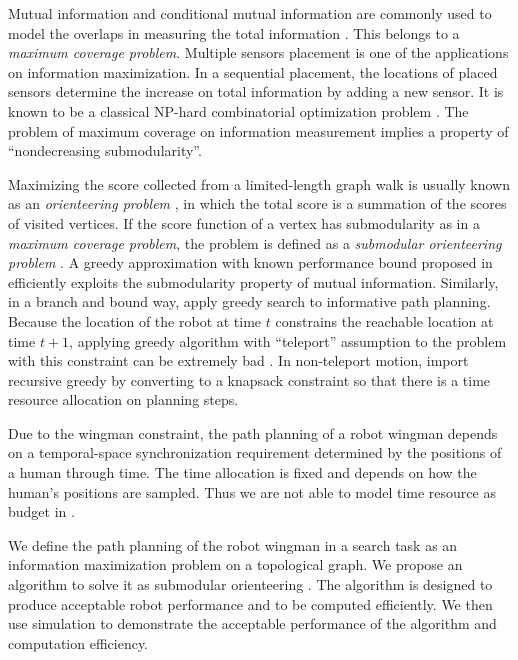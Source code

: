 Mutual information and conditional mutual information are commonly used to model the overlaps in measuring the total information \cite{singh2009efficient}.
This belongs to a \emph{maximum coverage problem}. 
Multiple sensors placement is one of the applications on information maximization.
In a sequential placement, the locations of placed sensors determine the increase on total information by adding a new sensor.
It is known to be a classical NP-hard combinatorial optimization problem \cite{megiddo1983maximum}.
The problem of maximum coverage on information measurement implies a property of ``nondecreasing submodularity''. 

Maximizing the score collected from a limited-length graph walk is usually known as an \emph{orienteering problem} \cite{Vansteenwegen20111}, in which the total score is a summation of the scores of visited vertices.
If the score function of a vertex has submodularity as in a \emph{maximum coverage problem}, the problem is defined as a \emph{submodular orienteering problem} \cite{chekuri2005recursive}.
A greedy approximation with known performance bound proposed in \cite{singh2009efficient} efficiently exploits the submodularity property of mutual information.
Similarly, in a branch and bound way, \cite{binney2012branch} apply greedy search to informative path planning.
Because the location of the robot at time $ t $ constrains the reachable location at time $ t+1 $, applying greedy algorithm with ``teleport'' assumption to the problem with this constraint can be extremely bad \cite{krause2012submodular}.
In non-teleport motion, \cite{chekuri2005recursive} import recursive greedy by converting to a knapsack constraint so that there is a time resource allocation on planning steps.

Due to the wingman constraint, the path planning of a robot wingman depends on a temporal-space synchronization requirement determined by the positions of a human through time.
The time allocation is fixed and depends on how the human's positions are sampled.
Thus we are not able to model time resource as budget in \cite{chekuri2005recursive}.   

We define the path planning of the robot wingman in a search task as an information maximization problem on a topological graph. We propose an algorithm to solve it as submodular orienteering . The algorithm is designed to produce acceptable robot performance and to be computed efficiently. We then use simulation to demonstrate the acceptable performance of the algorithm and computation efficiency. 
